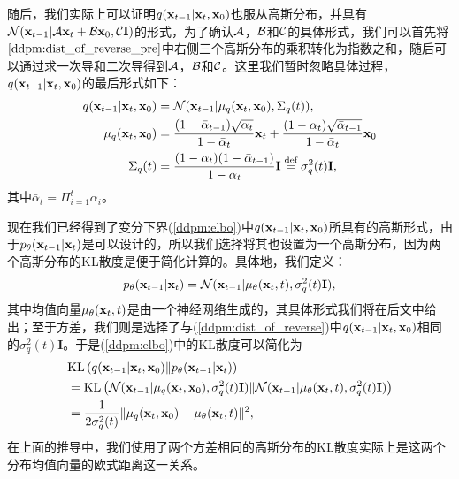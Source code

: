 \documentclass[11pt,a4paper,UTF8]{ctexart}
\begin{document}
随后，我们实际上可以证明$q(\mathbf{x}_{t-1}|\mathbf{x}_t,\mathbf{x}_0)$也服从高斯分布，并具有$\mathcal{N}(\mathbf{x}_{t-1}|\mathcal{A}\mathbf{x}_t+\mathcal{B}\mathbf{x}_0,\mathcal{C}\mathbf{I})$的形式，为了确认$\mathcal{A}$，$\mathcal{B}$和$\mathcal{C}$的具体形式，我们可以首先将$\ref{ddpm:dist_of_reverse_pre}$中右侧三个高斯分布的乘积转化为指数之和，随后可以通过求一次导和二次导得到$\mathcal{A}$，$\mathcal{B}$和$\mathcal{C}$。这里我们暂时忽略具体过程，$q(\mathbf{x}_{t-1}|\mathbf{x}_t,\mathbf{x}_0)$的最后形式如下：
\begin{align}
\begin{split}
    q(\mathbf{x}_{t-1}|\mathbf{x}_t,\mathbf{x}_0) &= \mathcal{N}(\mathbf{x}_{t-1}|\mu_q(\mathbf{x}_t,\mathbf{x}_0),\Sigma_q(t)),\\
    \mu_q(\mathbf{x}_t,\mathbf{x}_0) &= \frac{(1-\bar{\alpha}_{t-1})\sqrt{\alpha_t}}{1-\bar{\alpha}_t}\mathbf{x}_t + \frac{(1-\alpha_t)\sqrt{\bar{\alpha}_{t-1}}}{1-\bar{\alpha}_t}\mathbf{x}_0 \\
    \Sigma_q(t) &= \frac{(1-\alpha_t)(1-\bar{\alpha}_{t-1})}{1-\bar{\alpha}_t}\mathbf{I}  \stackrel{\text{def}}{=} \sigma_q^2(t)\mathbf{I},
\end{split}
\label{ddpm:dist_of_reverse}
\end{align}
其中$\bar{\alpha}_t=\Pi_{i=1}^t \alpha_i$。

现在我们已经得到了变分下界(\ref{ddpm:elbo})中$q(\mathbf{x}_{t-1}|\mathbf{x}_t,\mathbf{x}_0)$所具有的高斯形式，由于$p_{\theta}(\mathbf{x}_{t-1}|\mathbf{x}_t)$是可以设计的，所以我们选择将其也设置为一个高斯分布，因为两个高斯分布的KL散度是便于简化计算的。具体地，我们定义：
\begin{equation}
p_{\theta}(\mathbf{x}_{t-1}|\mathbf{x}_t) = \mathcal{N}(\mathbf{x}_{t-1}| \mu_{\theta}(\mathbf{x}_t,t), \sigma_q^2(t)\mathbf{I}),
\label{ddpm:p_reverse}
\end{equation}
其中均值向量$\mu_{\theta}(\mathbf{x}_t,t)$是由一个神经网络生成的，其具体形式我们将在后文中给出；至于方差，我们则是选择了与(\ref{ddpm:dist_of_reverse})中$q(\mathbf{x}_{t-1}|\mathbf{x}_t,\mathbf{x}_0)$相同的$\sigma_q^2(t)\mathbf{I}$。于是(\ref{ddpm:elbo})中的KL散度可以简化为
\begin{align}
\begin{split}
    & \text{KL}\left(q(\mathbf{x}_{t-1}|\mathbf{x}_t,\mathbf{x}_0) \| p_{\theta}(\mathbf{x}_{t-1}|\mathbf{x}_t)\right) \\
    &= \text{KL} \left(\mathcal{N}(\mathbf{x}_{t-1}|\mu_q(\mathbf{x}_t,\mathbf{x}_0),\sigma_q^2(t)\mathbf{I}) \| \mathcal{N}(\mathbf{x}_{t-1}| \mu_{\theta}(\mathbf{x}_t,t), \sigma_q^2(t)\mathbf{I})\right) \\
    &= \frac{1}{2\sigma_q^2(t)} \| \mu_q(\mathbf{x}_t,\mathbf{x}_0) - \mu_{\theta}(\mathbf{x}_t,t) \|^2,
\label{ddpm:elbo_simp_1}
\end{split}
\end{align}
在上面的推导中，我们使用了两个方差相同的高斯分布的KL散度实际上是这两个分布均值向量的欧式距离这一关系。
\end{document}
